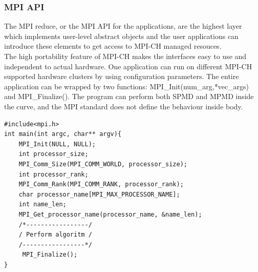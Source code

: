 \documentclass[11pt,openright,a4paper]{report}
\begin{document}
\subsubsection{MPI API}
The MPI reduce, or the MPI API for the applications, are the highest layer which implements user-level abstract objects and the user applications can introduce these elements to get access to MPI-CH managed resouces.\\
The high portability feature of MPI-CH makes the interfaces easy to use and independent to actual hardware. One application can run on different MPI-CH supported hardware clusters by using configuration parameters. The entire application can be wrapped by two functions: MPI\_Init(num\_arg,*vec\_args) and MPI\_Finalize(). The program can perform both SPMD and MPMD inside the curve, and the MPI standard does not define the behaviour inside body\cite{mpich_doc}.\\  
\begin{lstlisting}[breaklines,breakatwhitespace,caption={Example of using MPICH initialization-finalization pair in C},label=compression-psudoCode]
#include<mpi.h>
int main(int argc, char** argv){
	MPI_Init(NULL, NULL);
	int processor_size;
	MPI_Comm_Size(MPI_COMM_WORLD, processor_size);
	int processor_rank;
	MPI_Comm_Rank(MPI_COMM_RANK, processor_rank);
	char processor_name[MPI_MAX_PROCESSOR_NAME];
	int name_len;
	MPI_Get_processor_name(processor_name, &name_len);
	/*-----------------/
	/ Perform algoritm /
	/-----------------*/
	 MPI_Finalize();
}
\end{lstlisting}
\end{document}
